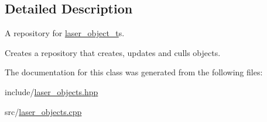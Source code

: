 \subsection{Detailed Description}
A repository for \hyperlink{classlaser__object__t}{laser\+\_\+object\+\_\+t}\textquotesingle{}s. 

Creates a repository that creates, updates and culls objects. 

The documentation for this class was generated from the following files\+:\begin{DoxyCompactItemize}
\item 
include/\hyperlink{laser__objects_8hpp}{laser\+\_\+objects.\+hpp}\item 
src/\hyperlink{laser__objects_8cpp}{laser\+\_\+objects.\+cpp}\end{DoxyCompactItemize}
